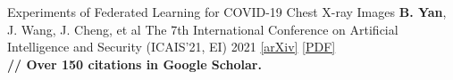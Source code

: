 \begin{cvpublications}

\cvpublication
{Experiments of Federated Learning for COVID-19 Chest X-ray Images} %
{\textbf{B. Yan}, J. Wang, J. Cheng, et al} %
{The 7th International Conference on Artificial Intelligence and Security (ICAIS'21, EI)} %
{2021} %
{
	\href{https://arxiv.org/abs/2007.05592}{[arXiv]} \href{https://link.springer.com/chapter/10.1007/978-3-030-78618-2_4}{[PDF]} \\
	\textbf{ // Over 150 citations in Google Scholar.} 
} %







\end{cvpublications}





